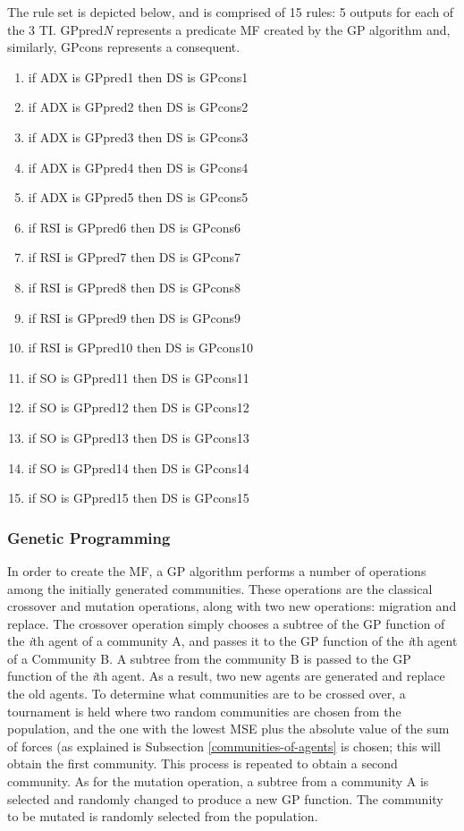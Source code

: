 The rule set is depicted below, and is comprised of 15 rules: 5 outputs for each of the 3 TI. GPpred\textit{N} represents a predicate MF created by the GP algorithm and, similarly, GPcons represents a consequent.

\begin{enumerate}
\item if ADX is GPpred1 then DS is GPcons1
\item if ADX is GPpred2 then DS is GPcons2
\item if ADX is GPpred3 then DS is GPcons3
\item if ADX is GPpred4 then DS is GPcons4
\item if ADX is GPpred5 then DS is GPcons5

\item if RSI is GPpred6 then DS is GPcons6
\item if RSI is GPpred7 then DS is GPcons7
\item if RSI is GPpred8 then DS is GPcons8
\item if RSI is GPpred9 then DS is GPcons9
\item if RSI is GPpred10 then DS is GPcons10

\item if SO is GPpred11 then DS is GPcons11
\item if SO is GPpred12 then DS is GPcons12
\item if SO is GPpred13 then DS is GPcons13
\item if SO is GPpred14 then DS is GPcons14
\item if SO is GPpred15 then DS is GPcons15
\end{enumerate}

\subsubsection{Genetic Programming}

In order to create the MF, a GP algorithm performs a number of operations among the initially generated communities. These operations are the classical crossover and mutation operations, along with two new operations: migration and replace. The crossover operation simply chooses a subtree of the GP function of the \textit{i}th agent of a community A, and passes it to the GP function of the \textit{i}th agent of a Community B. A subtree from the community B is passed to the GP function of the \textit{i}th agent. As a result, two new agents are generated and replace the old agents. To determine what communities are to be crossed over, a tournament is held where two random communities are chosen from the population, and the one with the lowest MSE plus the absolute value of the sum of forces (as explained is Subsection \ref{communities-of-agents} is chosen; this will obtain the first community. This process is repeated to obtain a second community. As for the mutation operation, a subtree from a community A is selected and randomly changed to produce a new GP function. The community to be mutated is randomly selected from the population.

